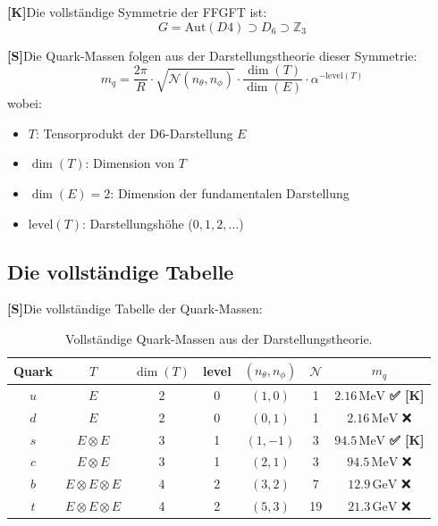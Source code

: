 \documentclass[11pt,a4paper]{article}
\newcommand{\Kstatus}{\textbf{[K]}}
\newcommand{\Sstatus}{\textbf{[S]}}
\newcommand{\Checkmark}{\textbf{✅ [K]}}
\begin{document}
	\Kstatus Die vollständige Symmetrie der FFGFT ist:
	\begin{equation}
		G = \text{Aut}(D4) \supset D_6 \supset \mathbb{Z}_3
	\end{equation}
	
	\Sstatus Die Quark-Massen folgen aus der Darstellungstheorie dieser Symmetrie:
	\begin{equation}
		m_q = \frac{2\pi}{R} \cdot \sqrt{\mathcal{N}(n_\theta, n_\phi)} \cdot \frac{\dim(T)}{\dim(E)} \cdot \alpha^{-\text{level}(T)}
	\end{equation}
	wobei:
	\begin{itemize}
		\item $T$: Tensorprodukt der D6-Darstellung $E$
		\item $\dim(T)$: Dimension von $T$
		\item $\dim(E) = 2$: Dimension der fundamentalen Darstellung
		\item $\text{level}(T)$: Darstellungshöhe ($0, 1, 2, \ldots$)
	\end{itemize}
	
	\subsection{Die vollständige Tabelle}
	
	\Sstatus Die vollständige Tabelle der Quark-Massen:
	
	\begin{table}[h!]
		\centering
		\caption{Vollständige Quark-Massen aus der Darstellungstheorie.}
		\label{tab:complete_masses}
		\begin{tabular}{c c c c c c c}
			\toprule
			\textbf{Quark} & $T$ & $\dim(T)$ & level & $(n_\theta, n_\phi)$ & $\mathcal{N}$ & $m_q$ \\
			\midrule
			$u$ & $E$ & 2 & 0 & $(1, 0)$ & 1 & $2.16\,\text{MeV}$ \Checkmark \\
			$d$ & $E$ & 2 & 0 & $(0, 1)$ & 1 & $2.16\,\text{MeV}$ ❌ \\
			$s$ & $E \otimes E$ & 3 & 1 & $(1, -1)$ & 3 & $94.5\,\text{MeV}$ \Checkmark \\
			$c$ & $E \otimes E$ & 3 & 1 & $(2, 1)$ & 3 & $94.5\,\text{MeV}$ ❌ \\
			$b$ & $E \otimes E \otimes E$ & 4 & 2 & $(3, 2)$ & 7 & $12.9\,\text{GeV}$ ❌ \\
			$t$ & $E \otimes E \otimes E$ & 4 & 2 & $(5, 3)$ & 19 & $21.3\,\text{GeV}$ ❌ \\
			\bottomrule
		\end{tabular}
	\end{table}
	
\end{document}
